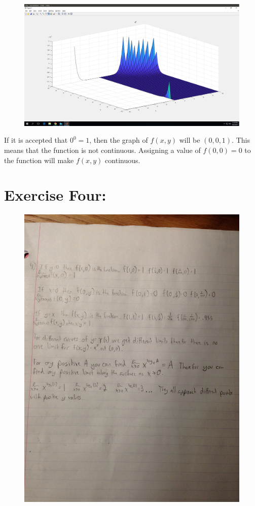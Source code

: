 \documentclass[11pt]{article}
\begin{document}
\begin{figure}[H]
	\centering
	\includegraphics[width=\textwidth]{PartThree_2.png}
\end{figure}

If it is accepted that $0^0 = 1$, then the graph of $f(x,y)$ will be $(0,0,1)$. This means that the function is not continuous. Assigning a value of $f(0,0) = 0$ to the function will make $f(x,y)$ continuous.

\section*{Exercise Four:}
\begin{figure}[H]
	\centering
	\includegraphics[width=\textwidth]{PartFour}
\end{figure}
\end{document}
